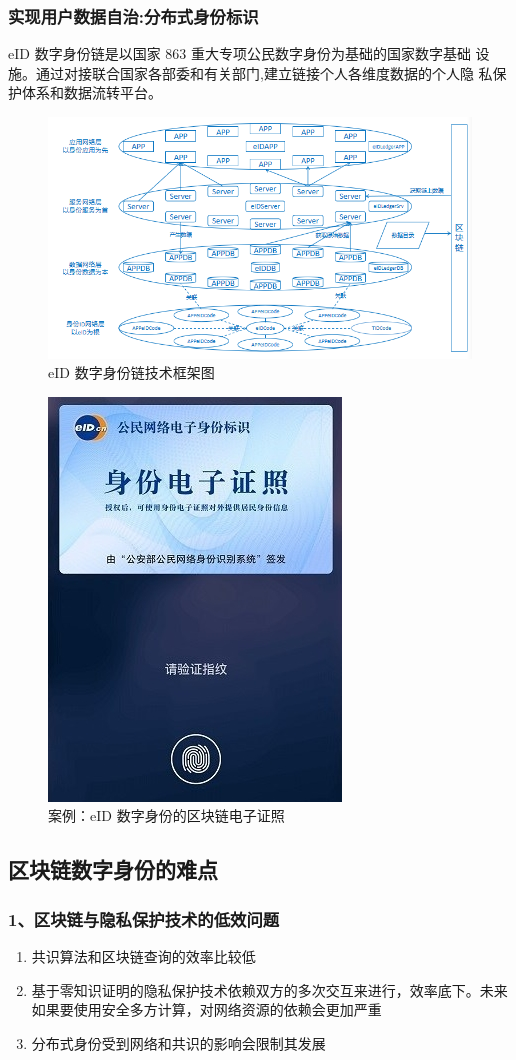 \documentclass[11pt]{beamer}
\begin{document}
\begin{frame}
	\frametitle{实现用户数据自治:分布式身份标识}
	eID 数字身份链是以国家 863 重大专项公民数字身份为基础的国家数字基础
	设施。通过对接联合国家各部委和有关部门,建立链接个人各维度数据的个人隐
	私保护体系和数据流转平台。
	
	\begin{minipage}[t]{0.5\linewidth}
		\begin{figure}
			\centering
			\includegraphics[width=\linewidth]{figures/eid/3}
			\caption{eID 数字身份链技术框架图}
		\end{figure}
	\end{minipage}%
	\begin{minipage}[t]{0.5\linewidth}
		\begin{figure}
	\centering
	\includegraphics[height=0.5\linewidth]{figures/eid/4}
	\caption{案例：eID 数字身份的区块链电子证照}
\end{figure}
	\end{minipage}
\end{frame}

\subsection{区块链数字身份的难点}
\begin{frame}
	\frametitle{1、区块链与隐私保护技术的低效问题}
	\begin{enumerate}
		\item 共识算法和区块链查询的效率比较低
		\item 基于零知识证明的隐私保护技术依赖双方的多次交互来进行，效率底下。未来如果要使用安全多方计算，对网络资源的依赖会更加严重
		\item 分布式身份受到网络和共识的影响会限制其发展
	\end{enumerate}
\end{frame}
\end{document}

